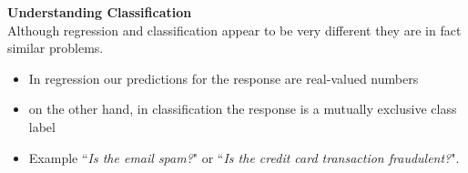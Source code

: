 \documentclass[SKL-MASTER.tex]{subfiles}
\begin{document}
%
%

\newpage
\noindent \textbf{Understanding Classification}\\
Although regression and classification appear to be very different they are in fact similar problems.

\begin{itemize}
\item In regression our predictions for the response are real-valued numbers
\item on the other hand, in classification the response is a mutually exclusive class label 
\item Example ``\textit{Is the email spam?}" or ``\textit{Is the credit card transaction fraudulent?}".
\end{itemize}
\end{document}
